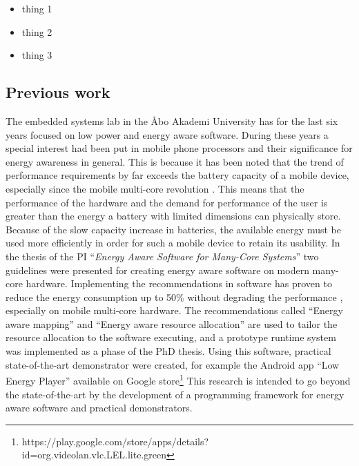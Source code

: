 \documentclass{article}
\begin{document}
\begin{itemize}
 \item thing 1
 \item thing 2
 \item thing 3
\end{itemize}


\subsection{Previous work}
The embedded systems lab in the \AA{}bo Akademi University has for the last six years focused on low power and energy aware software. 
During these years a special interest had been put in mobile phone processors and their significance for energy awareness in general. 
This is because it has been noted that the trend of performance requirements by far exceeds the battery capacity of a mobile device, especially since the mobile multi-core revolution \cite{BatteryCapacity,CPUCapacity}. 
This means that the performance of the hardware and the demand for performance of the user is greater than the energy a battery with limited dimensions can physically store. 
Because of the slow capacity increase in batteries, the available energy must be used more efficiently in order for such a mobile device to retain its usability.
In the thesis of the PI ``\textit{Energy Aware Software for Many-Core Systems}'' two guidelines were presented for creating energy aware software on modern many-core hardware. 
Implementing the recommendations in software has proven to reduce the energy consumption up to 50\% without degrading the performance \cite{HolmbackaHipeac}, especially on mobile multi-core hardware. 
The recommendations called ``Energy aware mapping'' and ``Energy aware resource allocation'' are used to tailor the resource allocation to the software executing, 
and a prototype runtime system was implemented as a phase of the PhD thesis. 
Using this software, practical state-of-the-art demonstrator were created, for example the Android app ``Low Energy Player'' available on Google store\footnote{https://play.google.com/store/apps/details?id=org.videolan.vlc.LEL.lite.green}
This research is intended to go beyond the state-of-the-art by the development of a programming framework for energy aware software and practical demonstrators.
\end{document}
